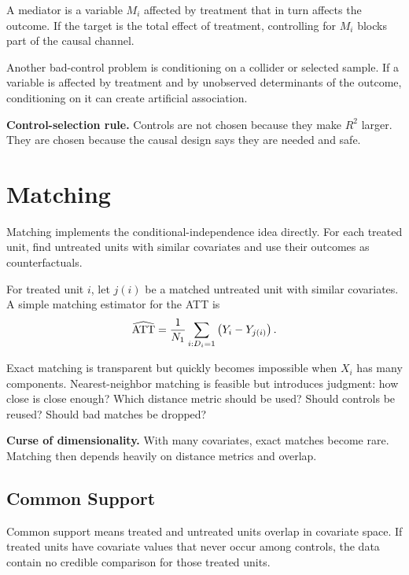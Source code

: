 \begin{defN}[Mediator]
A mediator is a variable \(M_i\) affected by treatment that in turn affects the
outcome. If the target is the total effect of treatment, controlling for
\(M_i\) blocks part of the causal channel.
\end{defN}

Another bad-control problem is conditioning on a collider or selected sample.
If a variable is affected by treatment and by unobserved determinants of the
outcome, conditioning on it can create artificial association.

\begin{boxF}
\textbf{Control-selection rule.} Controls are not chosen because they make
\(R^2\) larger. They are chosen because the causal design says they are needed
and safe.
\end{boxF}

\section{Matching}

Matching implements the conditional-independence idea directly. For each treated
unit, find untreated units with similar covariates and use their outcomes as
counterfactuals.

\begin{defN}
For treated unit \(i\), let \(j(i)\) be a matched untreated unit with similar
covariates. A simple matching estimator for the ATT is
\[
    \widehat{\mathrm{ATT}}
    =
    \frac{1}{N_1}\sum_{i:D_i=1}\left(Y_i-Y_{j(i)}\right).
\]
\end{defN}

Exact matching is transparent but quickly becomes impossible when \(X_i\) has
many components. Nearest-neighbor matching is feasible but introduces judgment:
how close is close enough? Which distance metric should be used? Should controls
be reused? Should bad matches be dropped?

\begin{boxF}
\textbf{Curse of dimensionality.} With many covariates, exact matches become
rare. Matching then depends heavily on distance metrics and overlap.
\end{boxF}

\subsection{Common Support}

Common support means treated and untreated units overlap in covariate space.
If treated units have covariate values that never occur among controls, the data
contain no credible comparison for those treated units.

